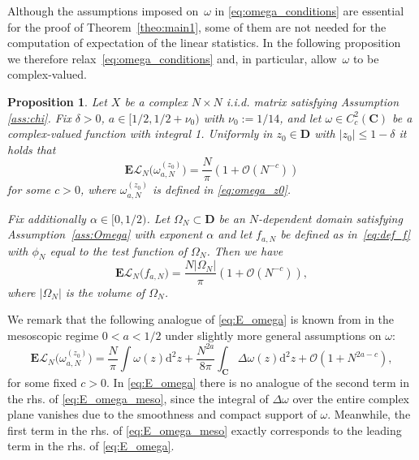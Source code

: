 \documentclass[10pt]{amsart}
\newtheorem{proposition}[theorem]{Proposition}
\numberwithin{equation}{section}
\newcommand{\dif}{\mathrm{d}}
\newcommand{\E}{\mathbf{E}}
\newcommand{\C}{\mathbf{C}}
\newcommand{\Lin}{\mathcal{L}}
\begin{document}
Although the assumptions imposed on~$\omega$ in \eqref{eq:omega_conditions} are essential for the proof of Theorem~\ref{theo:main1}, some of them are not needed for the computation of expectation of the linear statistics. In the following proposition we therefore relax~\eqref{eq:omega_conditions} and, in particular, allow~$\omega$ to be complex-valued.



\begin{proposition}\label{prop:E_omega} Let $X$ be a complex $N\times N$ i.i.d. matrix satisfying Assumption \ref{ass:chi}. Fix $\delta>0$, $a\in [1/2,1/2+\nu_0)$ with $\nu_0:=1/14$, and let $\omega\in C^2_c(\C)$ be a complex-valued function with integral 1. Uniformly in $z_0\in\mathbf{D}$ with $|z_0|\le 1-\delta$ it holds that
\begin{equation}
\E\Lin_N\big(\omega_{a,N}^{(z_0)}\big) = \frac{N}{\pi}\left(1+\mathcal{O}(N^{-c})\right)
\label{eq:E_omega}
\end{equation}
for some $c>0$, where $\omega_{a,N}^{(z_0)}$ is defined in \eqref{eq:omega_z0}.

Fix additionally $\alpha\in [0,1/2)$. Let $\Omega_N\subset \mathbf{D}$ be an $N$-dependent domain satisfying Assumption~\ref{ass:Omega} with exponent $\alpha$ and let $f_{a,N}$ be defined as in~\eqref{eq:def_f} with $\phi_N$ equal to the test function of $\Omega_N$. Then we have
\begin{equation}
\E\Lin_N\big(f_{a,N}\big) = \frac{N|\Omega_N|}{\pi}\left(1+\mathcal{O}(N^{-c})\right),
\label{eq:E_f}
\end{equation}
where $|\Omega_N|$ is the volume of $\Omega_N$.
\end{proposition}

We remark that the following analogue of \eqref{eq:E_omega} is known from \cite[Eq.(2.5)]{Cipolloni_meso} in the mesoscopic regime $0< a<1/2$ under slightly more general assumptions on $\omega$:
\begin{equation}
\E\Lin_N\big(\omega_{a,N}^{(z_0)}\big) = \frac{N}{\pi}\int \omega(z)\dif^2 z + \frac{N^{2a}}{8\pi} \int_\C \Delta \omega (z)\dif^2 z + \mathcal{O}(1+N^{2a-c}),
\label{eq:E_omega_meso}
\end{equation}
for some fixed $c>0$. In \eqref{eq:E_omega} there is no analogue of the second term in the rhs. of  \eqref{eq:E_omega_meso}, since the integral of $\Delta \omega$ over the entire complex plane vanishes due to the smoothness and compact support of $\omega$. Meanwhile, the first term in the rhs. of \eqref{eq:E_omega_meso} exactly corresponds to the leading term in the rhs. of \eqref{eq:E_omega}.
\end{document}
